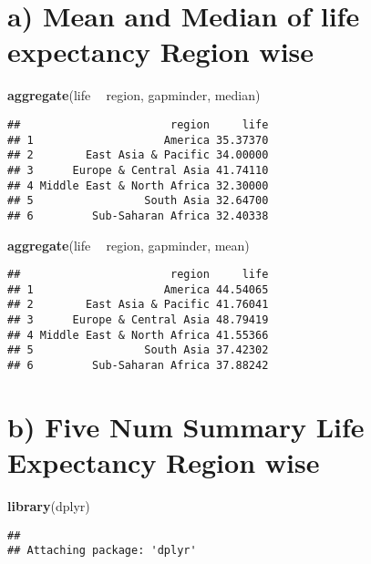 \documentclass[]{article}
\newenvironment{Shaded}{\begin{snugshade}}{\end{snugshade}}
\newcommand{\KeywordTok}[1]{\textcolor[rgb]{0.13,0.29,0.53}{\textbf{#1}}}
\newcommand{\StringTok}[1]{\textcolor[rgb]{0.31,0.60,0.02}{#1}}
\newcommand{\OperatorTok}[1]{\textcolor[rgb]{0.81,0.36,0.00}{\textbf{#1}}}
\newcommand{\NormalTok}[1]{#1}
\begin{document}
\section{a) Mean and Median of life expectancy Region
wise}\label{a-mean-and-median-of-life-expectancy-region-wise}

\begin{Shaded}
\begin{Highlighting}[]
\KeywordTok{aggregate}\NormalTok{(life }\OperatorTok{~}\StringTok{ }\NormalTok{region, gapminder, median)}
\end{Highlighting}
\end{Shaded}

\begin{verbatim}
##                       region     life
## 1                    America 35.37370
## 2        East Asia & Pacific 34.00000
## 3      Europe & Central Asia 41.74110
## 4 Middle East & North Africa 32.30000
## 5                 South Asia 32.64700
## 6         Sub-Saharan Africa 32.40338
\end{verbatim}

\begin{Shaded}
\begin{Highlighting}[]
\KeywordTok{aggregate}\NormalTok{(life }\OperatorTok{~}\StringTok{ }\NormalTok{region, gapminder, mean)}
\end{Highlighting}
\end{Shaded}

\begin{verbatim}
##                       region     life
## 1                    America 44.54065
## 2        East Asia & Pacific 41.76041
## 3      Europe & Central Asia 48.79419
## 4 Middle East & North Africa 41.55366
## 5                 South Asia 37.42302
## 6         Sub-Saharan Africa 37.88242
\end{verbatim}

\section{b) Five Num Summary Life Expectancy Region
wise}\label{b-five-num-summary-life-expectancy-region-wise}

\begin{Shaded}
\begin{Highlighting}[]
\KeywordTok{library}\NormalTok{(dplyr)}
\end{Highlighting}
\end{Shaded}

\begin{verbatim}
## 
## Attaching package: 'dplyr'
\end{verbatim}
\end{document}
